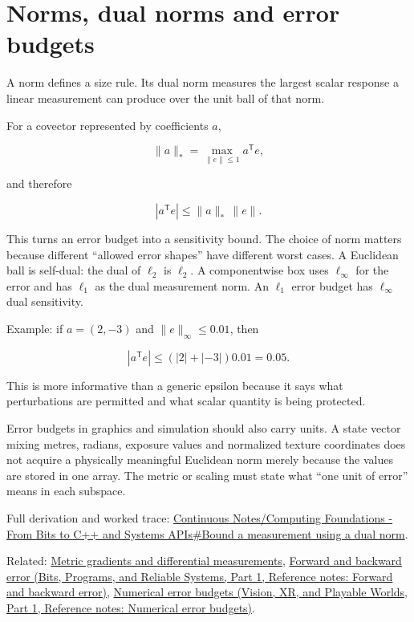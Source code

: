 \hypertarget{appendix-d6d9dbbe3c14}{}\label{referencestart:appendix-d6d9dbbe3c14}
\section{Norms, dual norms and error budgets}\label{appendix-d6d9dbbe3c14-norms-dual-norms-and-error-budgets}

\hypertarget{appendix-d6d9dbbe3c14-norms-dual-norms-and-error-budgets}{}

A norm defines a size rule. Its dual norm measures the largest scalar response a linear measurement can produce over the unit ball of that norm.

For a covector represented by coefficients \(a\),

\[
\|a\|_* = \max_{\|e\|\le 1} a^{\mathsf T}e,
\]

and therefore

\[
|a^{\mathsf T}e|\le \|a\|_*\,\|e\|.
\]

This turns an error budget into a sensitivity bound. The choice of norm matters because different ``allowed error shapes'' have different worst cases. A Euclidean ball is self-dual: the dual of \(\ell_2\) is \(\ell_2\). A componentwise box uses \(\ell_\infty\) for the error and has \(\ell_1\) as the dual measurement norm. An \(\ell_1\) error budget has \(\ell_\infty\) dual sensitivity.

Example: if \(a=(2,-3)\) and \(\|e\|_\infty\le0.01\), then

\[
|a^{\mathsf T}e|
\le (|2|+|{-3}|)0.01
=0.05.
\]

This is more informative than a generic epsilon because it says what perturbations are permitted and what scalar quantity is being protected.

Error budgets in graphics and simulation should also carry units. A state vector mixing metres, radians, exposure values and normalized texture coordinates does not acquire a physically meaningful Euclidean norm merely because the values are stored in one array. The metric or scaling must state what ``one unit of error'' means in each subspace.

Full derivation and worked trace: \hyperref[01-foundations-i-ch017-bound-a-measurement-using-a-dual-norm]{Continuous Notes/Computing Foundations - From Bits to C++ and Systems APIs\#Bound a measurement using a dual norm}.

Related: \hyperref[appendix-f4acdb1d5563]{Metric gradients and differential measurements}, \href{../01-Bits-Programs-and-Reliable-Systems-P01/main.pdf\#appendix-a7fbaf6d1b1c}{Forward and backward error (Bits, Programs, and Reliable Systems, Part 1, Reference notes: Forward and backward error)}, \href{../07-Vision-XR-and-Playable-Worlds-P01/main.pdf\#appendix-31b8c295e05f}{Numerical error budgets (Vision, XR, and Playable Worlds, Part 1, Reference notes: Numerical error budgets)}.

